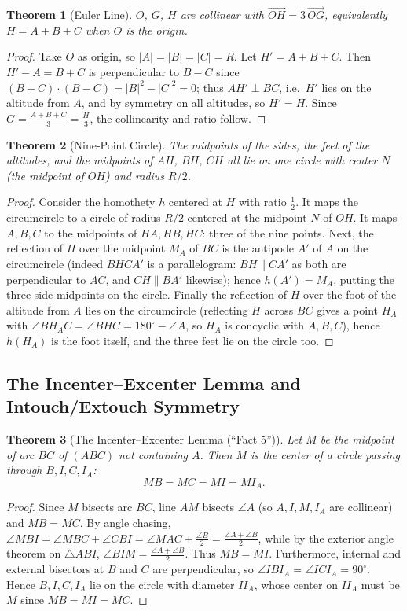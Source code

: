\documentclass[11pt]{article}
\theoremstyle{plain}
\newtheorem{theorem}{Theorem}[section]
\theoremstyle{definition}
\begin{document}
\begin{theorem}[Euler Line]
$O$, $G$, $H$ are collinear with $\vec{OH} = 3\,\vec{OG}$, equivalently
$H = A + B + C$ when $O$ is the origin.
\end{theorem}
\begin{proof}
Take $O$ as origin, so $|A|=|B|=|C|=R$. Let $H' = A+B+C$. Then
$H' - A = B + C$ is perpendicular to $B - C$ since
$(B+C)\cdot(B-C) = |B|^2 - |C|^2 = 0$; thus $AH' \perp BC$, i.e.\ $H'$ lies on
the altitude from $A$, and by symmetry on all altitudes, so $H'=H$. Since
$G = \frac{A+B+C}{3} = \frac{H}{3}$, the collinearity and ratio follow.
\end{proof}

\begin{theorem}[Nine-Point Circle]
The midpoints of the sides, the feet of the altitudes, and the midpoints of
$AH$, $BH$, $CH$ all lie on one circle with center $N$ (the midpoint of $OH$)
and radius $R/2$.
\end{theorem}
\begin{proof}
Consider the homothety $h$ centered at $H$ with ratio $\frac12$. It maps the
circumcircle to a circle of radius $R/2$ centered at the midpoint $N$ of $OH$.
It maps $A, B, C$ to the midpoints of $HA, HB, HC$: three of the nine points.
Next, the reflection of $H$ over the midpoint $M_A$ of $BC$ is the antipode
$A'$ of $A$ on the circumcircle (indeed $BHCA'$ is a parallelogram: $BH \parallel CA'$
as both are perpendicular to $AC$, and $CH \parallel BA'$ likewise); hence
$h(A') = M_A$, putting the three side midpoints on the circle. Finally the
reflection of $H$ over the foot of the altitude from $A$ lies on the
circumcircle (reflecting $H$ across $BC$ gives a point $H_A$ with
$\angle BH_AC = \angle BHC = 180^\circ - \angle A$, so $H_A$ is concyclic with
$A,B,C$), hence $h(H_A)$ is the foot itself, and the three feet lie on the
circle too.
\end{proof}

\subsection{The Incenter--Excenter Lemma and Intouch/Extouch Symmetry}

\begin{theorem}[The Incenter--Excenter Lemma (``Fact 5'')]
Let $M$ be the midpoint of arc $BC$ of $(ABC)$ not containing $A$. Then $M$ is the center of a circle passing through $B, I, C, I_A$:
\[
MB = MC = MI = MI_A.
\]
\end{theorem}
\begin{proof}
Since $M$ bisects arc $BC$, line $AM$ bisects $\angle A$ (so $A, I, M, I_A$ are collinear) and $MB = MC$. By angle chasing,
$\angle MBI = \angle MBC + \angle CBI = \angle MAC + \frac{\angle B}{2} = \frac{\angle A + \angle B}{2}$,
while by the exterior angle theorem on $\triangle ABI$, $\angle BIM = \frac{\angle A + \angle B}{2}$. Thus $MB = MI$. Furthermore, internal and external bisectors at $B$ and $C$ are perpendicular, so $\angle IBI_A = \angle ICI_A = 90^\circ$. Hence $B, I, C, I_A$ lie on the circle with diameter $II_A$, whose center on $II_A$ must be $M$ since $MB = MI = MC$.
\end{proof}
\end{document}
